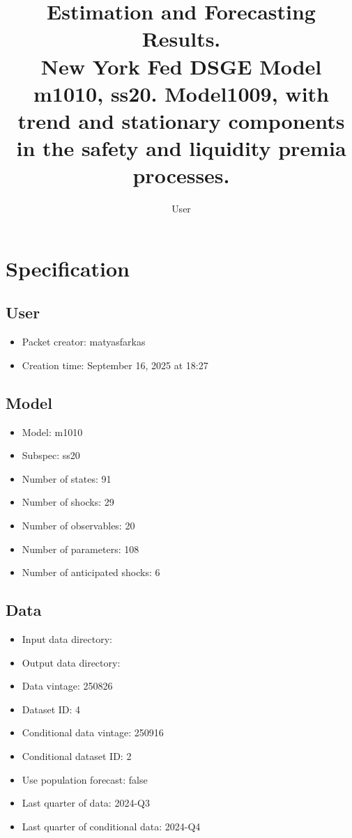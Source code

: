 \documentclass{article}
\title{Estimation and Forecasting Results. \\ New York Fed DSGE Model m1010, ss20. Model1009, with trend and stationary components in the safety and liquidity premia processes.}
\author{User}
\begin{document}
\maketitle


\section{Specification}

\subsection{User}

\begin{itemize}
  \item Packet creator: matyasfarkas
  \item Creation time: September 16, 2025 at 18:27
\end{itemize}

\subsection{Model}

\begin{itemize}
  \item Model: m1010
  \item Subspec: ss20
  \item Number of states: 91
  \item Number of shocks: 29
  \item Number of observables: 20
  \item Number of parameters: 108
  \item Number of anticipated shocks: 6
\end{itemize}

\subsection{Data}

\begin{itemize}
  \item Input data directory: 
  \item Output data directory: 
  \item Data vintage: 250826
  \item Dataset ID: 4
  \item Conditional data vintage: 250916
  \item Conditional dataset ID: 2
  \item Use population forecast: false
  \item Last quarter of data: 2024-Q3
  \item Last quarter of conditional data: 2024-Q4
\end{itemize}
\end{document}
